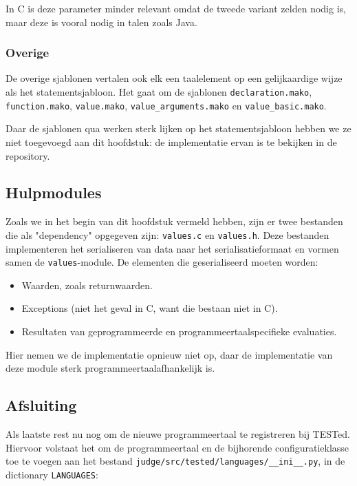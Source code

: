 In C is deze parameter minder relevant omdat de tweede variant zelden nodig is, maar deze is vooral nodig in talen zoals Java.

\subsubsection{Overige}

De overige sjablonen vertalen ook elk een taalelement op een gelijkaardige wijze als het statementsjabloon.
Het gaat om de sjablonen \texttt{declaration.mako}, \texttt{function.mako}, \texttt{value.mako}, \texttt{value\_arguments.mako} en \texttt{value\_basic.mako}.

Daar de sjablonen qua werken sterk lijken op het statementsjabloon hebben we ze niet toegevoegd aan dit hoofdstuk: de implementatie ervan is te bekijken in de repository.

\subsection{Hulpmodules}\label{subsec:hulpmodules}

Zoals we in het begin van dit hoofdstuk vermeld hebben, zijn er twee bestanden die als "dependency" opgegeven zijn: \texttt{values.c} en \texttt{values.h}.
Deze bestanden implementeren het serialiseren van data naar het serialisatieformaat en vormen samen de \texttt{values}-module.
De elementen die geserialiseerd moeten worden:

\begin{itemize}
    \item Waarden, zoals returnwaarden.
    \item Exceptions (niet het geval in C, want die bestaan niet in C).
    \item Resultaten van geprogrammeerde en programmeertaalspecifieke evaluaties.
\end{itemize}

Hier nemen we de implementatie opnieuw niet op, daar de implementatie van deze module sterk programmeertaalafhankelijk is.

\subsection{Afsluiting}\label{subsec:afsluiting}

Als laatste rest nu nog om de nieuwe programmeertaal te registreren bij TESTed.
Hiervoor volstaat het om de programmeertaal en de bijhorende configuratieklasse toe te voegen aan het bestand \texttt{judge/src/tested/languages/\_\_ini\_\_.py}, in de dictionary \texttt{LANGUAGES}:

